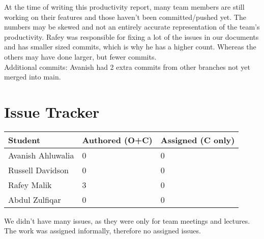 \documentclass{article}
\begin{document}
At the time of writing this productivity report, many team members are still working on their features and those haven't been committed/pushed yet. The numbers may be skewed and not an entirely accurate representation of the team's productivity. Rafey was responsible for fixing a lot of the issues in our documents and has smaller sized commits, which is why he has a higher count. Whereas the others may have done larger, but fewer commits.\\

Additional commits: Avanish had 2 extra commits from other branches not yet merged into main.

\section{Issue Tracker}

\begin{table}[H]
\centering
\begin{tabular}{lll}
\toprule
\textbf{Student} & \textbf{Authored (O+C)} & \textbf{Assigned (C only)}\\
\midrule
Avanish Ahluwalia & 0 & 0\\
Russell Davidson & 0 & 0\\
Rafey Malik & 3 & 0\\
Abdul Zulfiqar & 0 & 0\\
\bottomrule
\end{tabular}
\end{table}

We didn't have many issues, as they were only for team meetings and lectures. The work was assigned informally, therefore no assigned issues.
\end{document}
